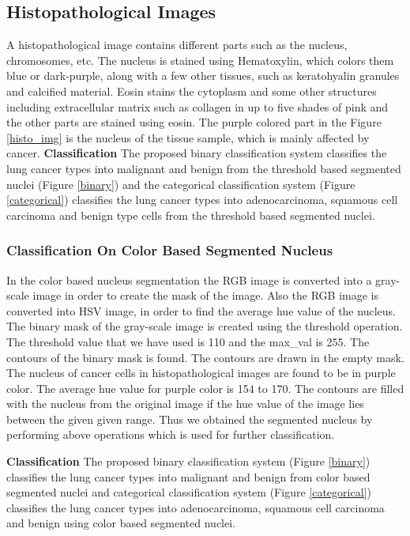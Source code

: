 \documentclass[conference]{IEEEtran}
\begin{document}
\subsection{Histopathological Images}
 A histopathological image contains different parts such as the nucleus, chromosomes, etc. The nucleus is stained using Hematoxylin, which colors them blue or dark-purple, along with a few other tissues, such as keratohyalin granules and calcified material. Eosin stains the cytoplasm and some other structures including extracellular matrix such as collagen in up to five shades of pink
 and the other parts are stained using eosin. The purple colored part in the Figure \ref{histo_img} is the nucleus of the tissue sample, which is mainly affected by cancer.
{\bf Classification}
The proposed binary classification system classifies the lung cancer types into malignant and benign from the threshold based segmented nuclei (Figure \ref{binary}) and the categorical classification system (Figure \ref{categorical}) classifies the lung cancer types into adenocarcinoma, squamous cell carcinoma and benign type cells from the threshold based segmented nuclei.

\subsubsection{Classification On Color Based Segmented Nucleus}
In the color based nucleus segmentation the RGB image is converted into a gray-scale image in order to create the mask of the image. Also the RGB image is converted into HSV image, in order to find the average hue value of the nucleus. The binary mask of the gray-scale image is created using the threshold operation. The threshold value that we have used is 110 and the max\_val is 255. The contours of the binary mask is found. The contours are drawn in the empty mask. The nucleus of cancer cells in histopathological images are found to be in purple color. The average hue value for purple color is 154 to 170. The contours are filled with the nucleus from the original image if the hue value of the image lies between the given given range. Thus we obtained the segmented nucleus by performing above operations which is used for further classification.

{\bf Classification}
The proposed binary classification system (Figure \ref{binary}) classifies the lung cancer types into malignant and benign from color based segmented nuclei and categorical classification system (Figure \ref{categorical}) classifies the lung cancer types into adenocarcinoma, squamous cell carcinoma and benign using color based segmented nuclei. 
\end{document}
